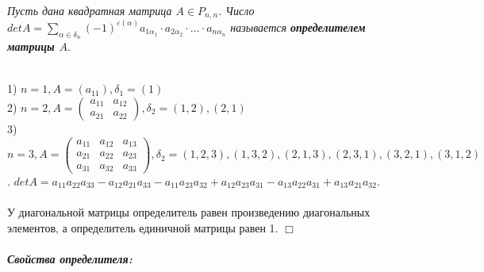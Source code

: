 \documentclass[a4paper, 12pt]{report}
\newenvironment{examp} %
{\par\noindent{\textbf{\textsc{Пример:}}}} %
{\hfill$\scriptstyle\Box$}
\begin{document}
	\textit{Пусть дана квадратная матрица $A \in P_{n, n}$. Число $det A = \sum\limits_{\alpha \in \delta_n} (-1)^{\varepsilon(\alpha)}a_{1\alpha_1} \cdot a_{2\alpha_2} \cdot \dots \cdot a_{n\alpha_n}$ называется \textbf{определителем матрицы $A$}}.\\
	\begin{examp}\\
	1) $n = 1, A = (a_{11}), \delta_1 = {(1)}$\\
	2) $n = 2, A =  \begin{pmatrix}
		a_{11}& a_{12}\\
		a_{21}& a_{22}
	\end{pmatrix}, \delta_2 = {(1, 2), (2, 1)}$\\
	3) $n = 3, A =  \begin{pmatrix}
		a_{11}& a_{12} & a_{13}\\
		a_{21}& a_{22} & a_{23}\\
		a_{31} & a_{32} & a_{33}
	\end{pmatrix}, \delta_2 = {(1, 2, 3), (1, 3, 2), (2, 1, 3), (2, 3, 1), (3, 2, 1), (3, 1, 2)}$. $det A = a_{11}a_{22}a_{33} - a_{12}a_{21}a_{33} - a_{11}a_{23}a_{32} + a_{12}a_{23}a_{31} - a_{13}a_{22}a_{31} + a_{13}a_{21}a_{32}$.\\\\
	У диагональной матрицы определитель равен произведению диагональных элементов, а определитель единичной матрицы равен 1.
	\end{examp}\\\\
	\textbf{\textit{Свойства определителя:}}
\end{document}
